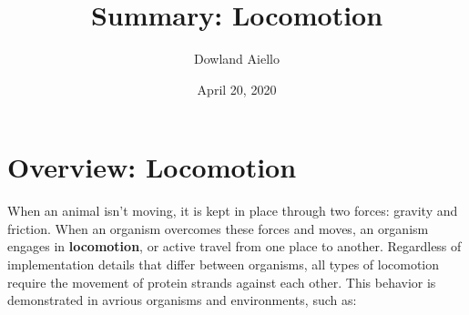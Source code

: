 \documentclass{article}
\begin{document}
\title{Summary: Locomotion}
\author{Dowland Aiello}
\date{April 20, 2020}

\maketitle
\tableofcontents
\fancyhf{}

\newpage

\section{Overview: Locomotion}

When an animal isn't moving, it is kept in place through two forces: gravity and
friction. When an organism overcomes these forces and moves, an organism
engages in \textbf{locomotion}, or active travel from one place to another.
Regardless of implementation details that differ between organisms, all types of
locomotion require the movement of protein strands against each other. This
behavior is demonstrated in avrious organisms and environments, such as:
\end{document}
